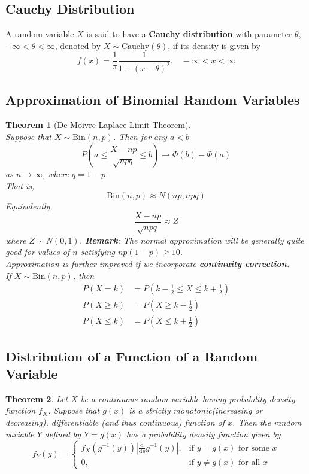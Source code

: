 \documentclass[12pt]{article}
\newcommand{\diff}{\mathrm{d}}
\newcommand{\bin}{\mathrm{Bin}}
\newcommand{\cauchy}{\mathrm{Cauchy}}
\newtheorem{theorem}{Theorem}[section]
\theoremstyle{definition}
\begin{document}
\subsection{Cauchy Distribution}
A random variable $X$ is said to have a \textbf{Cauchy distribution} with parameter $\theta$, $-\infty<\theta<\infty$, denoted by $X\sim\cauchy(\theta)$, if its density is given by
\[
f(x)=\frac{1}{\pi}\frac{1}{1+(x-\theta)^2},\;\;\;-\infty<x<\infty 
\]
\subsection{Approximation of Binomial Random Variables}
\begin{theorem}[De Moivre-Laplace Limit Theorem]
\hfill\\\normalfont Suppose that $X\sim \bin(n,p)$. Then for any $a<b$
\[
P\left(a\leq\frac{X-np}{\sqrt{npq}}\leq b\right)\to\Phi(b)-\Phi(a)
\]
as $n\to\infty$, where $q=1-p$.\\
That is,
\[
\bin(n,p)\approx N(np,npq)
\]
Equivalently,
\[
\frac{X-np}{\sqrt{npq}}\approx Z
\]
where $Z\sim N(0,1)$.
\textbf{Remark}: The normal approximation will be generally quite good for values of $n$ satisfying $np(1-p)\geq 10$.\\
Approximation is further improved if we incorporate \textbf{continuity correction}.\\
If $X\sim \bin(n,p)$, then
\[
\begin{aligned}
P(X=k)&=P\left(k-\frac{1}{2}\leq X\leq k+\frac{1}{2}\right)\\
P(X\geq k)&=P\left(X\geq k-\frac{1}{2}\right)\\
P(X\leq k)&=P\left(X\leq k+\frac{1}{2}\right)
\end{aligned}
\]
\end{theorem}
\subsection{Distribution of a Function of a Random Variable}
\begin{theorem}\normalfont Let $X$ be a continuous random variable having probability density function $f_X$. Suppose that $g(x)$ is a strictly monotonic(increasing or decreasing), differentiable (and thus continuous) function of $x$. Then the random variable $Y$ defined by $Y=g(x)$ has a probability density function given by
\[
f_Y(y)=\begin{cases}
f_X(g^{-1}(y))|\frac{\diff}{\diff y}g^{-1}(y)|,&\text{if }y=g(x)\text{ for some }x\\
0,&\text{if }y\neq g(x)\text{ for all }x
\end{cases}
\]
\end{theorem}
\clearpage
\end{document}
